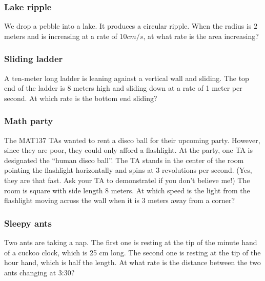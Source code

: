 \documentclass[14pt]{beamer}
\date{}
\title{}
\author{}
\begin{document}





	\begin{frame}[t]
		\frametitle{Lake ripple}

		We drop a pebble into a lake. It produces a circular ripple. When the radius
		is $2$ meters and is increasing at a rate of $10cm/s$, at what rate is the area
		increasing?
	\end{frame}

	\begin{frame}[t]
		\frametitle{Sliding ladder}

		A ten-meter long ladder is leaning against a vertical wall and sliding. The top
		end of the ladder is 8 meters high and sliding down at a rate of 1 meter per
		second. At which rate is the bottom end sliding?
	\end{frame}

	\begin{frame}[t]
		\frametitle{Math party}

		The MAT137 TAs wanted to rent a disco ball for their upcoming party. However,
		since they are poor, they could only afford a flashlight. At the party, one TA
		is designated the ``human disco ball''. The TA stands in the center of the
		room pointing the flashlight horizontally and spins at 3 revolutions per
		second. (Yes, they are that fast. Ask your TA to demonstratel if you don't
		believe me!) The room is square with side length 8 meters. At which speed is
		the light from the flashlight moving across the wall when it is 3 meters away
		from a corner?
	\end{frame}

	\begin{frame}[t]
		\frametitle{Sleepy ants}

		Two ants are taking a nap. The first one is resting at the tip of the minute
		hand of a cuckoo clock, which is 25 cm long. The second one is resting at the
		tip of the hour hand, which is half the length. At what rate is the distance
		between the two ants changing at 3:30?
	\end{frame}
\end{document}
